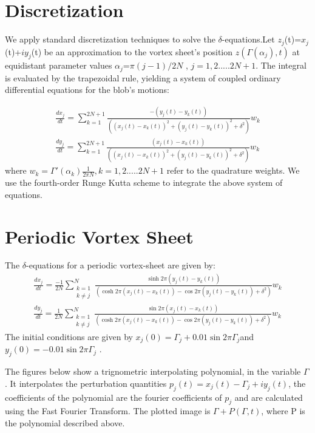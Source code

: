 \documentclass[12pt,twoside]{article}
\begin{document}
\section{Discretization}

We apply standard discretization techniques to solve the $\delta$-equations.Let $z_j$(t)=$x_j$(t)+$iy_j$(t) be an approximation to the vortex sheet's position $z(\Gamma(\alpha_j),t)$ at equidistant parameter values $\alpha_j$=$\pi(j-1)/2N$ , $j=1,2.....2N+1$. The integral is evaluated by the trapezoidal rule, yielding a system of coupled ordinary differential equations for the blob's motions:

\begin{subequations}
\begin{align}
\frac{d x_j}{d t} = \sum_{k=1}^{2N+1}{\frac{-(y_j(t)-y_k(t))}{((x_j(t)-x_k(t))^2 + (y_j(t)-y_k(t))^2 + \delta^2)}}w_k\\
\frac{d y_j}{d t} = \sum_{k=1}^{2N+1}{\frac{(x_j(t)-x_k(t))}{((x_j(t)-x_k(t))^2 + (y_j(t)-y_k(t))^2 + \delta^2)}}w_k
\end{align}
\end{subequations}
where $w_k=\Gamma'(\alpha_k)\frac{1}{2\pi N},k=1,2.....2N+1$ refer to the quadrature weights. We use the fourth-order Runge Kutta scheme to integrate the above system of equations.
\section{Periodic Vortex Sheet}
The $\delta$-equations for a periodic vortex-sheet are given by:
\begin{subequations}
\begin{align}
\frac{d x_j}{d t}  =\frac{-1}{2N} \sum_{{\substack{k=1 \\ k\neq j}}}^{N}{\frac{\sinh2\pi(y_j(t)-y_k(t))}{(\cosh2\pi(x_j(t)-x_k(t)) - \cos2\pi(y_j(t)-y_k(t)) + \delta^2)}}w_k\\
\frac{d y_j}{d t}=\frac{1}{2N} \sum_{{\substack{k=1 \\ k\neq j}}}^{N}{\frac{\sin2\pi(x_j(t)-x_k(t))}{(\cosh2\pi(x_j(t)-x_k(t)) - \cos2\pi(y_j(t)-y_k(t)) + \delta^2)}}w_k
\end{align}
\end{subequations}
The initial conditions are given by
$x_j(0)=\Gamma_j+0.01\sin2\pi\Gamma_j$and $y_j(0)=-0.01\sin2\pi\Gamma_j$ . 

The figures below show a trignometric interpolating polynomial, in the variable $\Gamma$. It interpolates the perturbation quantities $p_j(t)=x_j(t)-\Gamma_j + iy_j(t)$, the coefficients of the polynomial are the fourier coefficients of $p_j$ and are calculated using the Fast Fourier Transform. The plotted image is $\Gamma + P(\Gamma,t)$, where P is the polynomial described above.
\end{document}
